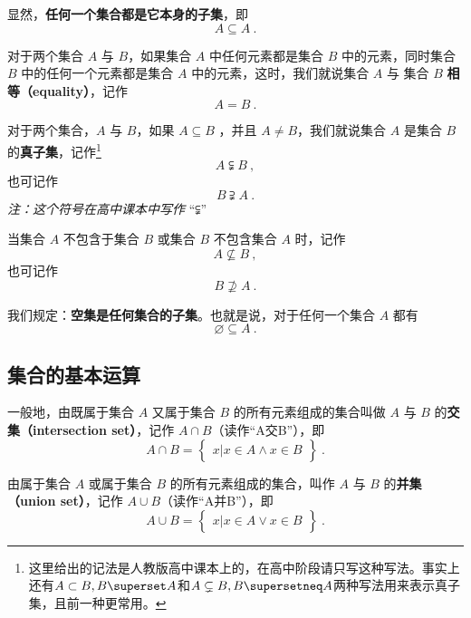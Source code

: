 显然，\textbf{任何一个集合都是它本身的子集}，即
\begin{equation}
A \subseteq A~.
\end{equation}

对于两个集合 $A$ 与 $B$，如果集合 $A$ 中任何元素都是集合 $B$ 中的元素，同时集合 $B$ 中的任何一个元素都是集合 $A$ 中的元素，这时，我们就说集合 $A$ 与 集合 $B$ \textbf{相等（equality）}，记作
\begin{equation}
A=B~.
\end{equation}

对于两个集合，$A$ 与 $B$，如果 $A\subseteq B$ ，并且 $A \ne B$，我们就说集合 $A$ 是集合 $B$ 的\textbf{真子集}，记作\footnote{这里给出的记法是人教版高中课本上的，在高中阶段请只写这种写法。事实上还有$A\subset B,B\superset A$和$A\subsetneq B,B\supersetneq A$两种写法用来表示真子集，且前一种更常用。}
\begin{equation}
A \subsetneqq B~,
\end{equation}
也可记作
\begin{equation}
B \supsetneqq A~.
\end{equation}
\textsl{注：这个符号在高中课本中写作} “⫋”

当集合 $A$ 不包含于集合 $B$ 或集合 $B$ 不包含集合 $A$ 时，记作
\begin{equation}
A \nsubseteq B~,
\end{equation}
也可记作
\begin{equation}
B \nsupseteq A~.
\end{equation}

我们规定：\textbf{空集是任何集合的子集}。也就是说，对于任何一个集合 $A$ 都有
\begin{equation}
\varnothing \subseteq A~.
\end{equation}

\subsection{集合的基本运算}
一般地，由既属于集合 $A$ 又属于集合 $B$ 的所有元素组成的集合叫做 $A$ 与 $B$ 的\textbf{交集（intersection set）}，记作 $A \cap B$（读作“A交B”），即
\begin{equation}
A\cap B = \begin{Bmatrix} x|x\in A \wedge x\in B \end{Bmatrix}~.
\end{equation}

由属于集合 $A$ 或属于集合 $B$ 的所有元素组成的集合，叫作 $A$ 与 $B$ 的\textbf{并集（union set）}，记作 $A\cup B$（读作“A并B”），即
\begin{equation}
A\cup B = \begin{Bmatrix}x|x\in A \vee x\in B\end{Bmatrix}~.
\end{equation}

